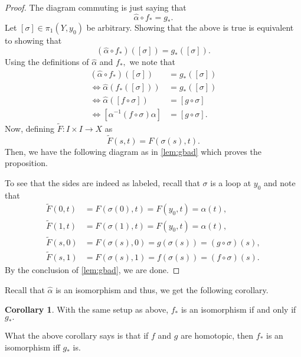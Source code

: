 \documentclass[12pt]{article}
\theoremstyle{definition}
\numberwithin{thm}{section}
\newtheorem{cor}[thm]{Corollary}
\begin{document}
\begin{proof} 
	The diagram commuting is just saying that
	\begin{equation*} 
		\widehat{\alpha} \circ f_* = g_*.
	\end{equation*}
	Let $[\sigma] \in \pi_1(Y, y_0)$ be arbitrary. Showing that the above is true is equivalent to showing that 
	\begin{equation*} 
		(\widehat{\alpha} \circ f_*)([\sigma]) = g_*([\sigma]).
	\end{equation*}
	Using the definitions of $\widehat{\alpha}$ and $f_*,$ we note that
	\begin{align*} 
		(\widehat{\alpha} \circ f_*)([\sigma]) &= g_*([\sigma])\\
		\iff \widehat{\alpha}(f_*([\sigma])) &= g_*([\sigma])\\
		\iff \widehat{\alpha}([f\circ \sigma]) &= [g\circ \sigma]\\
		\iff [\alpha^{-1}(f\circ \sigma) \alpha] &= [g\circ \sigma].
	\end{align*}
	Now, defining $\tilde{F}:I\times I \to X$ as
	\begin{equation*} 
		\tilde{F}(s, t) = F(\sigma(s), t).
	\end{equation*}
	Then, we have the following diagram as in \cref{lem:gbad} which proves the proposition.
	\begin{center}
	\end{center}
	To see that the sides are indeed as labeled, recall that $\sigma$ is a loop at $y_0$ and note that
	\begin{align*} 
		\tilde{F}(0, t) &= F(\sigma(0), t) = F(y_0, t) = \alpha(t),\\
		\tilde{F}(1, t) &= F(\sigma(1), t) = F(y_0, t) = \alpha(t),\\
		\tilde{F}(s, 0) &= F(\sigma(s), 0) = g(\sigma(s)) = (g\circ \sigma)(s),\\
		\tilde{F}(s, 1) &= F(\sigma(s), 1) = f(\sigma(s)) = (f\circ \sigma)(s).
	\end{align*}
	By the conclusion of \cref{lem:gbad}, we are done.
\end{proof}
Recall that $\widehat{\alpha}$ is an isomorphism and thus, we get the following corollary.
\begin{cor}
	With the same setup as above, $f_*$ is an isomorphism if and only if $g_*.$
\end{cor}
What the above corollary says is that if $f$ and $g$ are homotopic, then $f_*$ is an isomorphism iff $g_*$ is.
\end{document}
